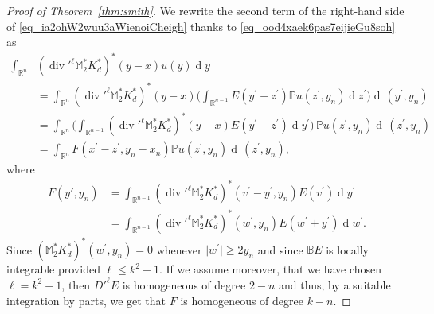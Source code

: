 \documentclass[a4paper,10pt]{amsart}
\newcommand{\R}{\mathbb R}
\renewcommand{\leq}{\leqslant}
\newcommand{\dif}{\mathrm{d}}
\DeclareMathOperator{\diver}{div}
\renewcommand{\dif}{\operatorname{d}\!}
\newcommand{\hold}{\operatorname{C}}
\numberwithin{equation}{section}
\theoremstyle{remark}
\numberwithin{equation}{section}
\begin{document}
\begin{proof}[Proof of Theorem~\ref{thm:smith}]
		We rewrite the second term of the right-hand side of \eqref{eq_ia2ohW2wuu3aWienoiCheigh}
		thanks to \eqref{eq_ood4xaek6pas7eijieGu8soh} as 	
		\begin{equation}
			\label{eq_fah7pho1OoxieBeiMei3quee}
			\begin{split}
				\int_{\R^n} & (\diver'^\ell \mathbb{M}_2^* K_d^*)^* (y-x)  u(y)\dif y\\
				&=\int_{\R^n}(\diver'^\ell \mathbb{M}_2^* K_d^*)^* (y-x) \biggl(\int_{\R^{n-1}} E(y^\prime-z^\prime)  \mathbb{P} u(z^\prime,y_n) \dif z^\prime\biggr) \dif\,( y^\prime, y_n)\\
				&= \int_{\R^n}\biggl(\int_{\R^{n-1}}(\diver'^\ell \mathbb{M}_2^* K_d^*)^* (y-x) E(y^\prime-z^\prime) \dif y^\prime\biggr) \, \mathbb{P} u(z^\prime,y_n) \dif\,( z^\prime, y_n)\\
				& =  \int_{\R^n} 
				F (x^\prime-z^\prime,y_n-x_n) \mathbb{P} u(z^\prime,y_n) \dif\,( z^\prime, y_n),
			\end{split}
		\end{equation}
		where 
		\begin{align*}
			F (y', y_n)&=\int_{\R^{n-1}}(\diver'^\ell \mathbb{M}_2^* K_d^*)^*(v^\prime-y^\prime,y_n) E(v^\prime) \dif y^\prime\\
			&=\int_{\R^{n-1}}(\diver'^\ell \mathbb{M}_2^* K_d^*)^* (w^\prime, y_n) E(w^\prime+y^\prime) \dif w^\prime.
		\end{align*}
		Since \((\mathbb{M}_2^* K_d^*)^* (w^\prime, y_n) = 0\) whenever \(\vert w^\prime\vert \ge 2 y_n\) and since \(\mathbb{B} E\) is locally integrable provided \(\ell \leq k^2 -1\).
		If we assume moreover, that we have chosen \(\ell = k^2 - 1\), 
		then \(D'^\ell E\) is homogeneous of degree \(2 - n\) and thus, by a suitable integration by parts, we get that \(F\) is homogeneous of degree \(k - n\).
		
		

\end{proof}
\end{document}

